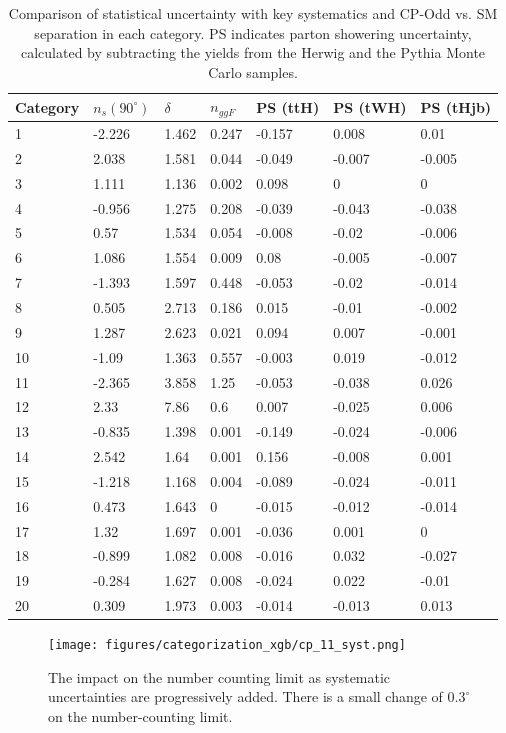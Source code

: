 \begin{table}[ht]
\begin{center}
\begin{tabular}{lllllll}
Category & $n_{s}(90^\circ)$ & $\delta$ & $n_{ggF}$ &PS (ttH)&PS (tWH)&PS (tHjb) \\ \hline 
1&-2.226&1.462&0.247&-0.157&0.008&0.01 \\ 
2&2.038&1.581&0.044&-0.049&-0.007&-0.005 \\ 
3&1.111&1.136&0.002&0.098&0&0 \\ 
4&-0.956&1.275&0.208&-0.039&-0.043&-0.038 \\ 
5&0.57&1.534&0.054&-0.008&-0.02&-0.006 \\ 
6&1.086&1.554&0.009&0.08&-0.005&-0.007 \\ 
7&-1.393&1.597&0.448&-0.053&-0.02&-0.014 \\
8&0.505&2.713&0.186&0.015&-0.01&-0.002 \\ 
9&1.287&2.623&0.021&0.094&0.007&-0.001 \\ 
10&-1.09&1.363&0.557&-0.003&0.019&-0.012 \\
11&-2.365&3.858&1.25&-0.053&-0.038&0.026 \\
12&2.33&7.86&0.6&0.007&-0.025&0.006 \\ \hline 
13&-0.835&1.398&0.001&-0.149&-0.024&-0.006 \\
14&2.542&1.64&0.001&0.156&-0.008&0.001 \\
15&-1.218&1.168&0.004&-0.089&-0.024&-0.011 \\
16&0.473&1.643&0&-0.015&-0.012&-0.014 \\
17&1.32&1.697&0.001&-0.036&0.001&0 \\
18&-0.899&1.082&0.008&-0.016&0.032&-0.027 \\
19&-0.284&1.627&0.008&-0.024&0.022&-0.01 \\ 
20&0.309&1.973&0.003&-0.014&-0.013&0.013 \\ \hline 
\hline
\end{tabular}
\end{center}
\vspace{-0.5cm}
\caption{Comparison of statistical uncertainty with key systematics and CP-Odd vs. SM separation in each category. PS indicates parton showering uncertainty, calculated by subtracting the yields from the Herwig and the Pythia Monte Carlo samples.}
\label{tab:systs}
\end{table}

\begin{figure}
  \centering
        \texttt{[image: figures/categorization\_xgb/cp\_11\_syst.png]}
  \caption{The impact on the number counting limit as systematic uncertainties are progressively added. There is a small change of $0.3^\circ$ on the number-counting limit. }
  \label{fig:ncrej_syst}
\end{figure}


